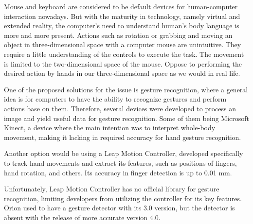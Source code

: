 Mouse and keyboard are considered to be default devices for human-computer interaction nowadays. But with the maturity in technology, namely virtual and extended reality, the computer's need to understand human's body language is more and more present. Actions such as rotation or grabbing and moving an object in three-dimensional space with a computer mouse are unintuitive. They require a little understanding of the controls to execute the task. The movement is limited to the two-dimensional space of the mouse. Oppose to performing the desired action by hands in our three-dimensional space as we would in real life.

One of the proposed solutions for the issue is gesture recognition, where a general idea is for computers to have the ability to recognize gestures and perform actions base on them. Therefore, several devices were developed to process an image and yield useful data for gesture recognition. Some of them being Microsoft Kinect, a device where the main intention was to interpret whole-body movement, making it lacking in required accuracy for hand gesture recognition. 

Another option would be using a Leap Motion Controller, developed specifically to track hand movements and extract its features, such as positions of fingers, hand rotation, and others. Its accuracy in finger detection is up to 0.01 mm.

Unfortunately, Leap Motion Controller has no official library for gesture recognition, limiting developers from utilizing the controller for its key features. Orion used to have a gesture detector with its 3.0 version, but the detector is absent with the release of more accurate version 4.0.